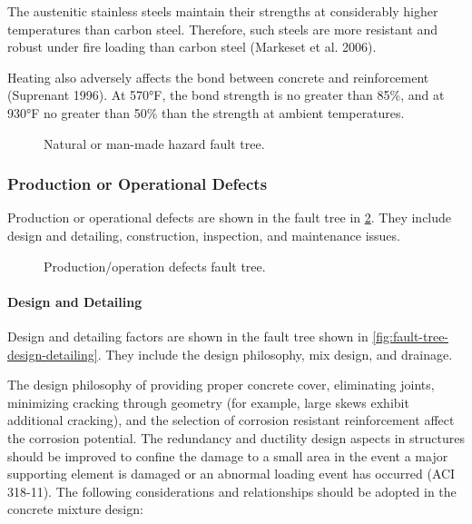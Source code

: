 The austenitic stainless steels maintain their strengths at considerably higher temperatures than carbon steel. Therefore, such steels are more resistant and robust under fire loading than carbon steel (Markeset et al. 2006). 

Heating also adversely affects the bond between concrete and reinforcement (Suprenant 1996). At 570°F, the bond strength is no greater than 85\%, and at 930°F no greater than 50\% than the strength at ambient temperatures.

\begin{figure}
  \caption{Natural or man-made hazard fault tree.}\label{fig:fault-tree-natural-manmade}
\end{figure}

\subsubsection{Production or Operational Defects}
Production or operational defects are shown in the fault tree in \cref{fig:fault-tree-production-operation}. They include design and detailing, construction, inspection, and maintenance issues.

\begin{figure}
  \caption{Production/operation defects fault tree.}\label{fig:fault-tree-production-operation}
\end{figure}

\paragraph{Design and Detailing}
Design and detailing factors are shown in the fault tree shown in \cref{fig:fault-tree-design-detailing}. They include the design philosophy, mix design, and drainage.

The design philosophy of providing proper concrete cover, eliminating joints, minimizing cracking through geometry (for example, large skews exhibit additional cracking), and the selection of corrosion resistant reinforcement affect the corrosion potential. The redundancy and ductility design aspects in structures should be improved to confine the damage to a small area in the event a major supporting element is damaged or an abnormal loading event has occurred (ACI 318-11). The following considerations and relationships should be adopted in the concrete mixture design:

